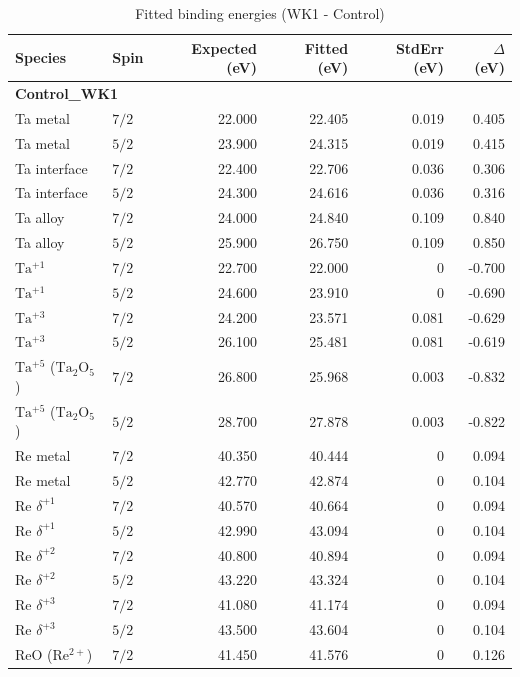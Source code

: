 \documentclass[12pt]{article}
\begin{document}
\begin{table}[H]
\centering
\begin{threeparttable}
\caption{Fitted binding energies (WK1 - Control)}
\begin{tabular}{llrrrr}
\toprule
Species & Spin & Expected (eV) & Fitted (eV) & StdErr (eV) & $\Delta$ (eV) \\
\midrule
\multicolumn{6}{l}{\textbf{Control\_WK1}} \\
Ta metal & $7/2$ & 22.000 & 22.405 & 0.019 & 0.405 \\
Ta metal & $5/2$ & 23.900 & 24.315 & 0.019 & 0.415 \\
Ta interface & $7/2$ & 22.400 & 22.706 & 0.036 & 0.306 \\
Ta interface & $5/2$ & 24.300 & 24.616 & 0.036 & 0.316 \\
Ta alloy & $7/2$ & 24.000 & 24.840 & 0.109 & 0.840 \\
Ta alloy & $5/2$ & 25.900 & 26.750 & 0.109 & 0.850 \\
$\mathrm{Ta^{+1}}$ & $7/2$ & 22.700 & 22.000 & 0 & -0.700 \\
$\mathrm{Ta^{+1}}$ & $5/2$ & 24.600 & 23.910 & 0 & -0.690 \\
$\mathrm{Ta^{+3}}$ & $7/2$ & 24.200 & 23.571 & 0.081 & -0.629 \\
$\mathrm{Ta^{+3}}$ & $5/2$ & 26.100 & 25.481 & 0.081 & -0.619 \\
$\mathrm{Ta^{+5}}$ ($\mathrm{Ta_2O_5}$) & $7/2$ & 26.800 & 25.968 & 0.003 & -0.832 \\
$\mathrm{Ta^{+5}}$ ($\mathrm{Ta_2O_5}$) & $5/2$ & 28.700 & 27.878 & 0.003 & -0.822 \\
Re metal & $7/2$ & 40.350 & 40.444 & 0 & 0.094 \\
Re metal & $5/2$ & 42.770 & 42.874 & 0 & 0.104 \\
$\mathrm{Re}$ $\delta^{+1}$ & $7/2$ & 40.570 & 40.664 & 0 & 0.094 \\
$\mathrm{Re}$ $\delta^{+1}$ & $5/2$ & 42.990 & 43.094 & 0 & 0.104 \\
$\mathrm{Re}$ $\delta^{+2}$ & $7/2$ & 40.800 & 40.894 & 0 & 0.094 \\
$\mathrm{Re}$ $\delta^{+2}$ & $5/2$ & 43.220 & 43.324 & 0 & 0.104 \\
$\mathrm{Re}$ $\delta^{+3}$ & $7/2$ & 41.080 & 41.174 & 0 & 0.094 \\
$\mathrm{Re}$ $\delta^{+3}$ & $5/2$ & 43.500 & 43.604 & 0 & 0.104 \\
$\mathrm{ReO}$ ($\mathrm{Re^{2+}}$) & $7/2$ & 41.450 & 41.576 & 0 & 0.126 \\

\end{tabular}
\end{threeparttable}
\end{table}
\end{document}
